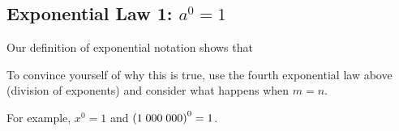             \subsection{ Exponential Law 1: ${a}^{0}=1$}
            \nopagebreak
        \label{m38359*id63512}Our definition of exponential notation shows that\par 
        \label{m38359*uid5}\nopagebreak\noindent{}
        \label{m38359*eip-662}To convince yourself of why this is true, use the fourth exponential law above (division of exponents) and consider what happens when $m=n$.\par \label{m38359*id63571}For example, ${x}^{0}=1$ and ${\left(1\phantom{\rule{0.277778em}{0ex}}000\phantom{\rule{0.277778em}{0ex}}000\right)}^{0}=1$.\par 
\label{m38359*secfhsst!!!underscore!!!id339}
